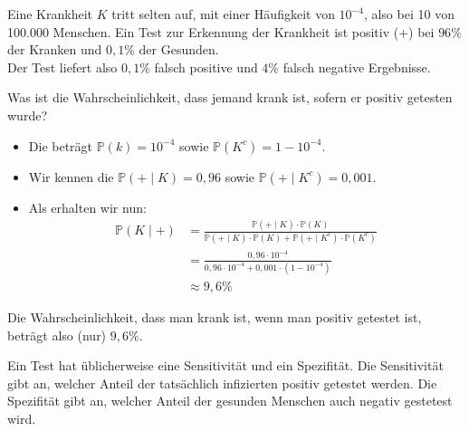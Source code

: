 \begin{example}
    Eine Krankheit $K$ tritt selten auf, mit einer Häufigkeit von  $10^{-4}$, also bei 10 von 100.000 Menschen. Ein Test zur Erkennung der Krankheit ist positiv (+) bei $96\%$ der Kranken und  $0,1\%$ der Gesunden. \\
    Der Test liefert also  $0,1\%$ falsch positive und  $4\%$ falsch negative Ergebnisse.
     \begin{question}
        Was ist die Wahrscheinlichkeit, dass jemand krank ist, sofern er positiv getesten wurde?
    \end{question}
    \begin{itemize}
        \item Die  beträgt $\mathbb{P}(k) = 10^{-4}$ sowie $\mathbb{P}(K^{c}) = 1-10^{-4}$.
        \item Wir kennen die  $\mathbb{P}(+\mid K) = 0,96$ sowie $\mathbb{P}(+\mid K^{c}) = 0,001$.
        \item Als  erhalten wir nun:
            \begin{equation*}
                \begin{split}
                    \mathbb{P}(K\mid +) &= \frac{\mathbb{P}(+\mid K)\cdot \mathbb{P}(K)}{\mathbb{P}(+ \mid  K) \cdot \mathbb{P}(K) + \mathbb{P}(+ \mid K^{c}) \cdot  \mathbb{P}(K^{c})} \\
                                        &= \frac{0,96 \cdot 10^{-4}}{0,96\cdot 10^{-4}+0,001\cdot (1-10^{-4})} \\
                                        &\approx 9,6\%
                \end{split}
            \end{equation*}
    \end{itemize}
    \begin{answer}
        \color{blue} Die Wahrscheinlichkeit, dass man krank ist, wenn man positiv getestet ist, beträgt also (nur) $9,6\%$.
    \end{answer}
\end{example}
\begin{remark*}
    Ein Test hat üblicherweise eine Sensitivität und ein Spezifität. Die Sensitivität gibt an, welcher Anteil der tatsächlich infizierten positiv getestet werden. Die Spezifität gibt an, welcher Anteil der gesunden Menschen auch negativ gestetest wird.
\end{remark*}
